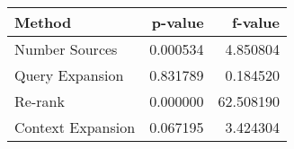 \begin{tabular}{lrr}
\toprule
Method & p-value & f-value \\
\midrule
Number Sources & 0.000534 & 4.850804 \\
Query Expansion & 0.831789 & 0.184520 \\
Re-rank & 0.000000 & 62.508190 \\
Context Expansion & 0.067195 & 3.424304 \\
\bottomrule
\end{tabular}
